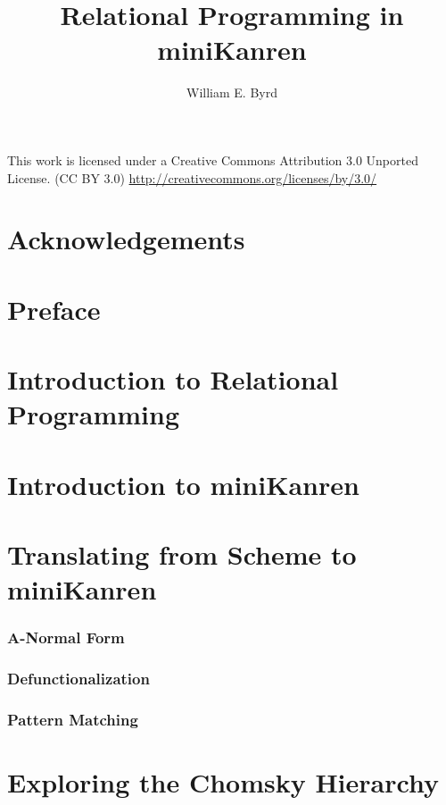 \documentclass[11pt]{book}
\begin{document}
\begin{schemeregion}

\title{Relational Programming in miniKanren}
\author{William E. Byrd}
\maketitle
\tableofcontents

\newpage
\huge
\ccLogo
\ccAttribution
This work is licensed under a Creative Commons Attribution 3.0 Unported License.
(CC BY 3.0) \url{http://creativecommons.org/licenses/by/3.0/}

\normalsize

\chapter{Acknowledgements}

\chapter{Preface}

\chapter{Introduction to Relational Programming}

\chapter{Introduction to miniKanren}

\chapter{Translating from Scheme to miniKanren}
\subsection{A-Normal Form}
\subsection{Defunctionalization}
\subsection{Pattern Matching}

\chapter{Exploring the Chomsky Hierarchy}

\end{schemeregion}
\end{document}
